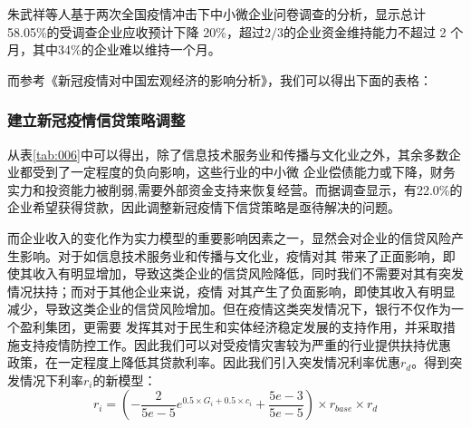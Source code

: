 \documentclass[withoutpreface,bwprint]{cumcmthesis}
\begin{document}
朱武祥等人基于两次全国疫情冲击下中小微企业问卷调查的分析\cite{zhuwuxiang2020}，显示总计58.05\%的受调查企业应收预计下降
20\%，超过$2/3$的企业资金维持能力不超过 2 个月，其中34\%的企业难以维持一个月。

而参考《新冠疫情对中国宏观经济的影响分析》\cite{mawanqing2020}，我们可以得出下面的表格：
\begin{table}[H]
    \caption{受新冠疫情影响各行业的收入变化比例$\varphi$ }\label{tab:006}
    \centering
\end{table}

\subsubsection{建立新冠疫情信贷策略调整}
从表\ref{tab:006}中可以得出，除了信息技术服务业和传播与文化业之外，其余多数企业都受到了一定程度的负向影响，这些行业的中小微
企业偿债能力或下降，财务实力和投资能力被削弱,需要外部资金支持来恢复经营。而据调查\cite{zhuwuxiang2020}显示，有22.0\%的
企业希望获得贷款，因此调整新冠疫情下信贷策略是亟待解决的问题。

而企业收入的变化作为实力模型的重要影响因素之一，显然会对企业的信贷风险产生影响。对于如信息技术服务业和传播与文化业，疫情对其
带来了正面影响，即使其收入有明显增加，导致这类企业的信贷风险降低，同时我们不需要对其有突发情况扶持；而对于其他企业来说，疫情
对其产生了负面影响，即使其收入有明显减少，导致这类企业的信贷风险增加。但在疫情这类突发情况下，银行不仅作为一个盈利集团，更需要
发挥其对于民生和实体经济稳定发展的支持作用，并采取措施支持疫情防控工作。因此我们可以对受疫情灾害较为严重的行业提供扶持优惠
政策，在一定程度上降低其贷款利率。因此我们引入突发情况利率优惠$r_d$。得到突发情况下利率$r_i$的新模型：
\begin{equation}
    r_i = (-\frac{2}{5e-5} e^{0.5\times G_i + 0.5\times c_i} + \frac{5e-3}{5e-5}) \times r_{base} \times r_d
\end{equation}
\end{document}
